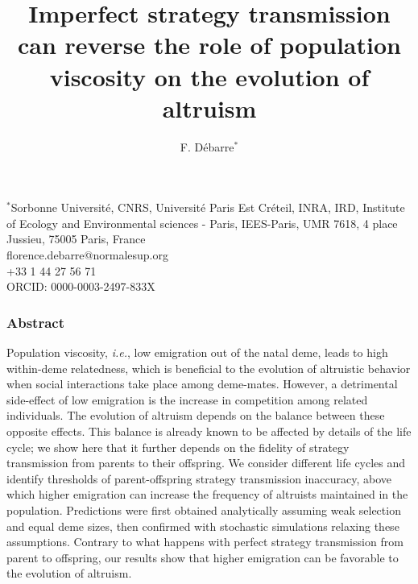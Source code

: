 \documentclass[11pt, letterpaper]{article}
\title{\Large Imperfect strategy transmission can reverse the role of population viscosity on the evolution of altruism}
\date{}
\author{F. D\'ebarre$^*$}
\newcommand{\ie}{\textit{i.e.}}
\begin{document}
\pagestyle{maintext}


\maketitle

\noindent $^*$Sorbonne Universit\'e, CNRS, Universit\'e Paris Est Créteil, INRA, IRD, Institute of Ecology and Environmental sciences - Paris, IEES-Paris, UMR 7618, 4 place Jussieu, 75005 Paris, France\\
florence.debarre@normalesup.org\\
+33 1 44 27 56 71\\
ORCID: 0000-0003-2497-833X

%
%

\subsubsection*{Abstract}
Population viscosity, \ie, low emigration out of the natal deme, leads to high within-deme relatedness, which is beneficial to the evolution of altruistic behavior when social interactions take place among deme-mates. However, a detrimental side-effect of low emigration is the increase in competition among related individuals. The evolution of altruism depends on the balance between these opposite effects. This balance is already known to be affected by details of the life cycle; we show here that it further depends on the fidelity of strategy transmission from parents to their offspring. We consider different life cycles and identify thresholds of parent-offspring strategy transmission inaccuracy, above which higher emigration can increase the frequency of altruists maintained in the population. Predictions were first obtained analytically assuming weak selection and equal deme sizes, then confirmed with stochastic simulations relaxing these assumptions. Contrary to what happens with perfect strategy transmission from parent to offspring, our results show that higher emigration can be favorable to the evolution of altruism. 
\end{document}
